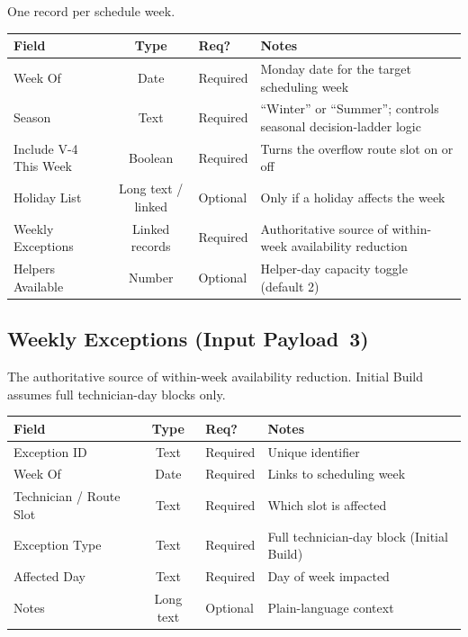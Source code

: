 \documentclass[12pt]{article}
\begin{document}
One record per schedule week.

\medskip
{\small
\begin{longtable}{lclp{4.5cm}}
\toprule
\textbf{Field} & \textbf{Type} & \textbf{Req?} & \textbf{Notes} \\
\midrule
Week Of            & Date     & Required  & Monday date for the target scheduling week \\
Season             & Text     & Required  & ``Winter'' or ``Summer''; controls seasonal decision-ladder logic \\
Include V-4 This Week & Boolean & Required & Turns the overflow route slot on or off \\
Holiday List       & Long text / linked & Optional & Only if a holiday affects the week \\
Weekly Exceptions  & Linked records & Required & Authoritative source of within-week availability reduction \\
Helpers Available  & Number   & Optional  & Helper-day capacity toggle (default 2) \\
\bottomrule
\end{longtable}
}

\subsection*{Weekly Exceptions (Input Payload~3)}

The authoritative source of within-week availability reduction.  Initial Build assumes full technician-day blocks only.

\medskip
{\small
\begin{longtable}{lclp{4cm}}
\toprule
\textbf{Field} & \textbf{Type} & \textbf{Req?} & \textbf{Notes} \\
\midrule
Exception ID             & Text   & Required & Unique identifier \\
Week Of                  & Date   & Required & Links to scheduling week \\
Technician / Route Slot  & Text   & Required & Which slot is affected \\
Exception Type           & Text   & Required & Full technician-day block (Initial Build) \\
Affected Day             & Text   & Required & Day of week impacted \\
Notes                    & Long text & Optional & Plain-language context \\
\bottomrule
\end{longtable}
}
\end{document}
